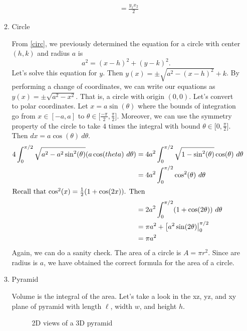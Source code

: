 \begin{enumerate}
\begin{enumerate}[label = (\alph*), ref = \theenumi{(\alph*)}]
\begin{align*}
      &= \frac{y_1x_2}{2}
    \end{align*}
  \item
    \label{15b}
    Circle
    \par\smallskip
    From \cref{circ}, we previously determined the equation for a circle with
    center \((h, k)\) and radius \(a\) is
    \[
    a^2 = (x - h)^2 + (y - k)^2.
    \]
    Let's solve this equation for \(y\).
    Then \(y(x) = \pm\sqrt{a^2 - (x - h)^2} + k\).
    By performing a change of coordinates, we can write our equations as
    \(y(x) = \pm\sqrt{a^2 - x^2}\).
    That is, a circle with origin \((0, 0)\).
    Let's convert to polar coordinates.
    Let \(x = a\sin(\theta)\) where the bounds of integration go from
    \(x\in[-a, a]\) to \(\theta\in\big[\frac{-\pi}{2}, \frac{\pi}{2}\big]\).
    Moreover, we can use the symmetry property of the circle to take \(4\) times
    the integral with bound \(\theta\in\big[0, \frac{\pi}{2}\big]\).
    Then \(dx = a\cos(\theta) \ d\theta\).
    \begin{align*}
      4\int_0^{\pi/2}\sqrt{a^2 - a^2\sin^2(\theta)}(a\cos(theta) \ d\theta)
      &= 4a^2\int_0^{\pi/2}\sqrt{1 - \sin^2(\theta)}\cos(\theta) \ d\theta\\
      &= 4a^2\int_0^{\pi/2}\cos^2(\theta) \ d\theta\\
      \intertext{Recall that \(\cos^2(x) = \frac{1}{2}(1 + \cos(2x))\).
      Then}
      &= 2a^2\int_0^{\pi/2}(1 + \cos(2\theta)) \ d\theta\\
      &= \pi a^2 + \big[a^2\sin(2\theta)\big|_0^{\pi/2}\\
      &= \pi a^2
    \end{align*}
    Again, we can do a sanity check.
    The area of a circle is \(A = \pi r^2\).
    Since are radius is \(a\), we have obtained the correct formula for the area
    of a circle.
  \item
    \label{15c}
    Pyramid
    \par\smallskip
    Volume is the integral of the area.
    Let's take a look in the xz, yz, and xy plane of pyramid with length
    \(\ell\), width \(w\), and height \(h\).
    \begin{figure}[H]
      \centering
      \caption{2D views of a 3D pyramid}
      \label{pyramid}

\end{figure}
\end{enumerate}
\end{enumerate}
